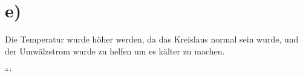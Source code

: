 

\section*{e)}
Die Temperatur wurde höher werden, da das Kreislaus normal sein wurde, und der Umwälzstrom wurde zu helfen um es kälter zu machen.

```